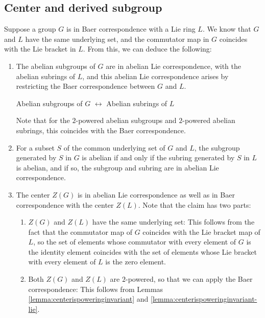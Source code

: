 \documentclass{ucetd}
\begin{document}
\subsection{Center and derived subgroup}\label{sec:baer-correspondence-center-and-derived}

Suppose a group $G$ is in Baer correspondence with a Lie ring $L$. We
know that $G$ and $L$ have the same underlying set, and the commutator
map in $G$ coincides with the Lie bracket in $L$. From this, we can
deduce the following:

\begin{enumerate}
\item The abelian subgroups of $G$ are in abelian Lie correspondence,
  with the abelian subrings of $L$, and this abelian Lie
  correspondence arises by restricting the Baer correspondence between
  $G$ and $L$.

  \begin{center}
    Abelian subgroups of $G$ $\leftrightarrow$ Abelian subrings of $L$
  \end{center}

  Note that for the $2$-powered abelian subgroups and $2$-powered
  abelian subrings, this coincides with the Baer correspondence.
\item For a subset $S$ of the common underlying set of $G$ and $L$,
  the subgroup generated by $S$ in $G$ is abelian if and only if the
  subring generated by $S$ in $L$ is abelian, and if so, the subgroup
  and subring are in abelian Lie correspondence.
\item The center $Z(G)$ is in abelian Lie correspondence as well as in
  Baer correspondence with the center $Z(L)$. Note that the claim has
  two parts:

  \begin{enumerate}
  \item $Z(G)$ and $Z(L)$ have the same underlying set: This follows
    from the fact that the commutator map of $G$ coincides with the
    Lie bracket map of $L$, so the set of elements whose commutator
    with every element of $G$ is the identity element coincides with
    the set of elements whose Lie bracket with every element of $L$ is
    the zero element.
  \item Both $Z(G)$ and $Z(L)$ are $2$-powered, so that we can apply
    the Baer correspondence: This follows from Lemmas
    \ref{lemma:centerispoweringinvariant} and
    \ref{lemma:centerispoweringinvariant-lie}.
  \end{enumerate}


\end{enumerate}
\end{document}
